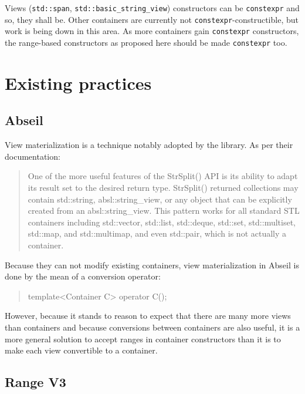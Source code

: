 \documentclass{wg21}
\newcommand{\cc}[1]{\texttt{#1}}
\begin{document}
Views (\cc{std::span}, \cc{std::basic_string_view}) constructors can be \cc{constexpr} and so, they shall be.
Other containers are currently not \cc{constexpr}-constructible, but work is being down in this area.
As more containers gain \cc{constexpr} constructors, the range-based constructors as proposed here should be made \cc{constexpr} too.

\section{Existing practices}

\subsection{Abseil}

View materialization is a technique notably adopted by the \cite{Abseil} library. As per their documentation:

\begin{quote}
    One of the more useful features of the StrSplit() API is its ability to adapt its result set to the desired return type.
    StrSplit() returned collections may contain std::string, absl::string_view, or any object that can be explicitly created from an absl::string_view.
    This pattern works for all standard STL containers including std::vector,
    std::list, std::deque, std::set, std::multiset, std::map, and std::multimap, and even std::pair, which is not actually a container.
\end{quote}

Because they can not modify existing containers, view materialization in Abseil is done by the mean of a conversion operator:

\begin{quote}
\begin{codeblock}
template<Container C>
operator C();
\end{codeblock}
\end{quote}

However, because it stands to reason to expect that there are many more views than containers and because conversions between containers are also useful,
it is a more general solution to accept ranges in container constructors than it is to make each view convertible to a container.


\subsection{Range V3}
\end{document}
